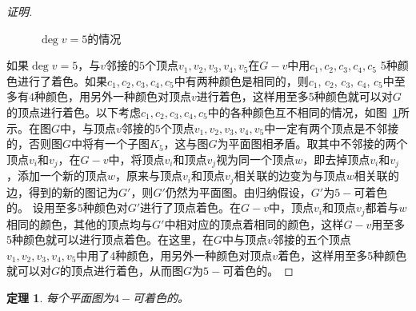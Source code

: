 \documentclass{book}[oneside]
\newtheorem{Thm}{定理}[chapter]
\begin{document}
\begin{CJK*}{UTF8}{gbsn}
\begin{proof}[证明]
\begin{figure}
\begin{minipage}{0.49\linewidth}
  \caption{$\deg v = 5$的情况}
  \label{fig:collision}
  \end{minipage}
\end{figure}    


如果$\deg v = 5$，与$v$邻接的$5$个顶点$v_1,v_2,v_3,v_4,v_5$在$G-v$中用$c_1,c_2,c_3,c_4,c_5$ 5种颜色进行了着色。如果$c_1,c_2,c_3,c_4,c_5$中有两种颜色是相同的，则$c_1$, $c_2$, $c_3$, $c_4$, $c_5$中至多有$4$种颜色，用另外一种颜色对顶点$v$进行着色，这样用至多5种颜色就可以对$G$的顶点进行着色。以下考虑$c_1,c_2,c_3,c_4,c_5$中的各种颜色互不相同的情况，如图~\ref{fig:collision}所示。在图$G$中，与顶点$v$邻接的$5$个顶点$v_1,v_2,v_3,v_4,v_5$中一定有两个顶点是不邻接的，否则图$G$中将有一个子图$K_5$，这与图$G$为平面图相矛盾。取其中不邻接的两个顶点$v_i$和$v_j$，在$G-v$中，将顶点$v_i$和顶点$v_j$视为同一个顶点$w$，即去掉顶点$v_i$和$v_j$，添加一个新的顶点$w$，原来与顶点$v_i$和顶点$v_j$相关联的边变为与顶点$w$相关联的边，得到的新的图记为$G'$，则$G'$仍然为平面图。由归纳假设，$G'$为$5-$可着色的。 设用至多$5$种颜色对$G'$进行了顶点着色。在$G-v$中，顶点$v_i$和顶点$v_j$都着与$w$相同的颜色，其他的顶点均与$G'$中相对应的顶点着相同的颜色，这样$G-v$用至多5种颜色就可以进行顶点着色。在这里，在$G$中与顶点$v$邻接的五个顶点$v_1,v_2,v_3,v_4,v_5$中用了4种颜色，用另外一种颜色对顶点$v$着色，这样用至多5种颜色就可以对$G$的顶点进行着色，从而图$G$为$5-$可着色的。
\end{proof}

  \begin{Thm}
    每个平面图为$4-$可着色的。
  \end{Thm}

\chapter{}

\end{CJK*}
\end{document}
